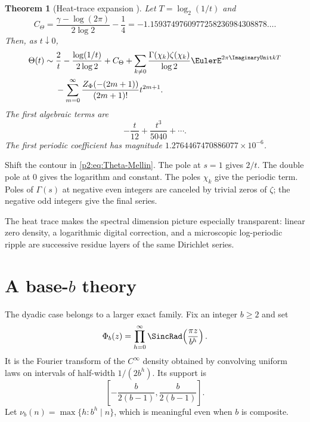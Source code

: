 \documentclass[11pt]{article}
\numberwithin{equation}{section}
\newtheorem{theorem}{Theorem}[section]
\theoremstyle{definition}
\theoremstyle{remark}
\begin{document}
\begin{theorem}[Heat-trace expansion \NewResult]
\label{p2:thm:heat}
Let $T=\log_2(1/t)$ and
\begin{equation}
 C_{\Theta}=\frac{\gamma-\log(2\pi)}{2\log2}-\frac14
 =-1.1593749760977258236984308878\ldots.                  \label{p2:eq:Ctheta}
\end{equation}
Then, as $t\downarrow0$,
\begin{align}
 \Theta(t)\sim{}&\frac2t-\frac{\log(1/t)}{2\log2}+C_{\Theta}
 +\sum_{k\ne0}\frac{\Gamma(\chi_k)\zeta(\chi_k)}{\log2}
   \EulerE^{2\pi\ImaginaryUnit kT}                                      \label{p2:eq:heat-asymp}\\
 &-\sum_{m=0}^{\infty}
 \frac{Z_\Phi(-(2m+1))}{(2m+1)!}t^{2m+1}.\nonumber
\end{align}
The first algebraic terms are
\begin{equation}
 -\frac{t}{12}+\frac{t^3}{5040}+\cdots.                   \label{p2:eq:heat-first}
\end{equation}
The first periodic coefficient has magnitude
$1.2764467470886077\times10^{-6}$.
\end{theorem}

\begin{proofidea}
Shift the contour in \eqref{p2:eq:Theta-Mellin}.  The pole at $s=1$ gives $2/t$.
The double pole at $0$ gives the logarithm and constant.  The poles $\chi_k$
give the periodic term.  Poles of $\Gamma(s)$ at negative even integers are
canceled by trivial zeros of $\zeta$; the negative odd integers give the final
series.
\end{proofidea}

The heat trace makes the spectral dimension picture especially transparent:
linear zero density, a logarithmic digital correction, and a microscopic
log-periodic ripple are successive residue layers of the same Dirichlet series.

\section{A base-$b$ theory}
\label{p2:sec:baseb}

The dyadic case belongs to a larger exact family.  Fix an integer $b\ge2$ and set
\begin{equation}
 \Phi_b(z)=\prod_{h=0}^{\infty}\SincRad\!\left(\frac{\pi z}{b^h}\right).       \label{p2:eq:Phib}
\end{equation}
It is the Fourier transform of the $C^\infty$ density obtained by convolving
uniform laws on intervals of half-width $1/(2b^h)$.  Its support is
\begin{equation}
 \left[-\frac{b}{2(b-1)},\frac{b}{2(b-1)}\right].          \label{p2:eq:supportb}
\end{equation}
Let $\nu_b(n)=\max\{h:b^h\mid n\}$, which is meaningful even when $b$ is
composite.
\end{document}
